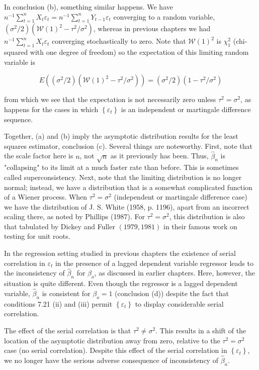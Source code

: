 \documentclass[10pt]{article}
\begin{document}
In conclusion (b), something similar happens. We have $n^{-1} \sum_{t=1}^{n} X_{t} \varepsilon_{t}= n^{-1} \sum_{t=1}^{n} Y_{t-1} \varepsilon_{t}$ converging to a random variable, $\left(\sigma^{2} / 2\right)\left(\mathcal{W}(1)^{2}-\tau^{2} / \sigma^{2}\right)$, whereas in previous chapters we had $n^{-1} \sum_{t=1}^{n} X_{t} \varepsilon_{t}$ converging stochastically to zero. Note that $\mathcal{W}(1)^{2}$ is $\chi_{1}^{2}$ (chi-squared with one degree of freedom) so the expectation of this limiting random variable is

$$
E\left(\left(\sigma^{2} / 2\right)\left(\mathcal{W}(1)^{2}-\tau^{2} / \sigma^{2}\right)\right)=\left(\sigma^{2} / 2\right)\left(1-\tau^{2} / \sigma^{2}\right)
$$

from which we see that the expectation is not necessarily zero unless $\tau^{2}= \sigma^{2}$, as happens for the cases in which $\left\{\varepsilon_{t}\right\}$ is an independent or martingale difference sequence.

Together, (a) and (b) imply the asymptotic distribution results for the least squares estimator, conclusion (c). Several things are noteworthy. First, note that the scale factor here is $n$, not $\sqrt{n}$ as it previously has been. Thus, $\hat{\beta}_{n}$ is "collapsing" to its limit at a much faster rate than before. This is sometimes called superconsistency. Next, note that the limiting distribution is no longer normal; instead, we have a distribution that is a somewhat complicated function of a Wiener process. When $\tau^{2}=\sigma^{2}$ (independent or martingale difference case) we have the distribution of J. S. White (1958, p. 1196), apart from an incorrect scaling there, as noted by Phillips (1987). For $\tau^{2}=\sigma^{2}$, this distribution is also that tabulated by Dickey and Fuller $(1979,1981)$ in their famous work on testing for unit roots.

In the regression setting studied in previous chapters the existence of serial correlation in $\varepsilon_{t}$ in the presence of a lagged dependent variable regressor leads to the inconsistency of $\hat{\beta}_{n}$ for $\beta_{o}$, as discussed in earlier chapters. Here, however, the situation is quite different. Even though the regressor is a lagged dependent variable, $\hat{\beta}_{n}$ is consistent for $\beta_{o}=1$ (conclusion (d)) despite the fact that conditions 7.21 (ii) and (iii) permit $\left\{\varepsilon_{t}\right\}$ to display considerable serial correlation.

The effect of the serial correlation is that $\tau^{2} \neq \sigma^{2}$. This results in a shift of the location of the asymptotic distribution away from zero, relative to the $\tau^{2}=\sigma^{2}$ case (no serial correlation). Despite this effect of the serial correlation in $\left\{\varepsilon_{t}\right\}$, we no longer have the serious adverse consequence of inconsistency of $\hat{\beta}_{n}$.
\end{document}
